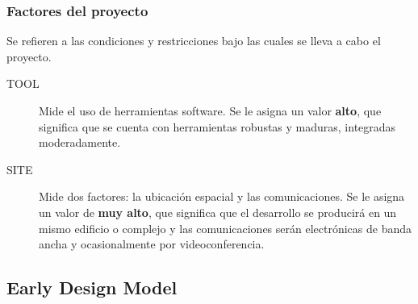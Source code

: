 \documentclass[11pt,a4paper,spanish,twoside]{report}
\begin{document}
\subsubsection{Factores del proyecto}
Se refieren a las condiciones y restricciones bajo las cuales se lleva a cabo
el proyecto.
\begin{description}
\item[TOOL] Mide el uso de herramientas software. Se le asigna un valor
\textbf{alto}, que significa que se cuenta con herramientas robustas y
maduras, integradas moderadamente.
\item[SITE] Mide dos factores: la ubicación espacial y las comunicaciones.
Se le asigna un valor de \textbf{muy alto}, que significa que el desarrollo
se producirá en un mismo edificio o complejo y las comunicaciones serán
electrónicas de banda ancha y ocasionalmente por videoconferencia.
\end{description}

\subsection{Early Design Model}
\end{document}

